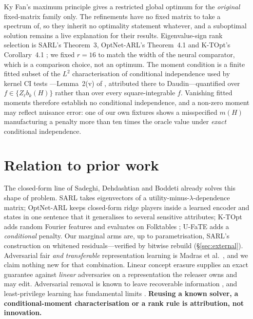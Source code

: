 \documentclass[10pt]{article}
\begin{document}
Ky Fan's maximum principle \citep{fan1949weyl} gives a restricted global optimum for the
\emph{original} fixed-matrix family only. The refinements have no fixed matrix to take a spectrum of,
so they inherit no optimality statement whatever, and a suboptimal solution remains a live
explanation for their results. Eigenvalue-sign rank selection is SARL's Theorem~3, OptNet-ARL's
Theorem~4.1 and K-TOpt's Corollary~4.1 \citep{sadeghi2019sarl,sadeghi2021optnetarl,sadeghi2022ktopt};
we fixed $r=16$ to match the width of the neural comparator, which is a comparison choice, not an
optimum. The moment condition is a finite fitted subset of the $L^2$ characterisation of conditional
independence used by kernel CI tests \citep{zhang2011kci,strobl2019rcit}---Lemma~2(v) of
\citet{zhang2011kci}, attributed there to Daudin---quantified over $f\in\{Z_\ell b_k(H)\}$ rather than
over every square-integrable $f$. Vanishing fitted moments therefore establish no conditional
independence, and a non-zero moment may reflect nuisance error: one of our own fixtures shows a
misspecified $m(H)$ manufacturing a penalty more than ten times the oracle value under \emph{exact}
conditional independence.

\section{Relation to prior work}
\label{sec:related}

The closed-form line of Sadeghi, Dehdashtian and Boddeti already solves this shape of problem. SARL
\citep{sadeghi2019sarl} takes eigenvectors of a utility-minus-$\lambda$-dependence matrix; OptNet-ARL
\citep{sadeghi2021optnetarl} keeps closed-form ridge players inside a learned encoder and states in
one sentence that it generalises to several sensitive attributes; K-TOpt \citep{sadeghi2022ktopt} adds
random Fourier features and evaluates on Folktables \citep{ding2021retiring}; U-FaTE
\citep{dehdashtian2024ufate} adds a \emph{conditional} penalty. Our marginal arms are, up to
parametrisation, SARL's construction on whitened residuals---verified by bitwise rebuild
(\S\ref{sec:external}). Adversarial fair \emph{and transferable} representation learning is Madras et
al.\ \citep{madras2018laftr}, and we claim nothing new for that combination. Linear concept erasure
\citep{belrose2023leace,holstege2025splince} supplies an exact guarantee against \emph{linear}
adversaries on a representation the releaser owns and may edit. Adversarial removal is known to leave
recoverable information \citep{elazar2018adversarial}, and least-privilege learning has fundamental
limits \citep{stadler2024leastprivilege}. \textbf{Reusing a known solver, a conditional-moment
characterisation or a rank rule is attribution, not innovation.}
\end{document}
